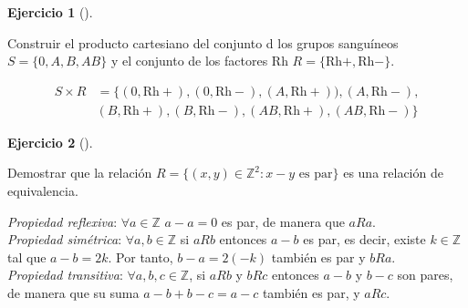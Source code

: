 \documentclass[
  spanish,
  a4paper,
]{scrreport}
\theoremstyle{definition}
\newtheorem{exercise}{Ejercicio}[chapter]
\theoremstyle{remark}
\begin{document}
\begin{exercise}[]\protect\hypertarget{exr-producto-cartesiano-grupos-sanguineos}{}\label{exr-producto-cartesiano-grupos-sanguineos}

Construir el producto cartesiano del conjunto d los grupos sanguíneos
\(S=\{0, A, B, AB\}\) y el conjunto de los factores Rh
\(R=\{\mbox{Rh}+, \mbox{Rh}-\}\).

\end{exercise}

\begin{tcolorbox}[enhanced jigsaw, arc=.35mm, bottomrule=.15mm, bottomtitle=1mm, breakable, colback=white, colbacktitle=quarto-callout-tip-color!10!white, colframe=quarto-callout-tip-color-frame, coltitle=black, left=2mm, leftrule=.75mm, opacityback=0, opacitybacktitle=0.6, rightrule=.15mm, title=\textcolor{quarto-callout-tip-color}{\faLightbulb}\hspace{0.5em}{Solución}, titlerule=0mm, toprule=.15mm, toptitle=1mm]

\begin{align*}
S \times R &=\{(0,\mbox{Rh}+), (0,\mbox{Rh}-), (A,\mbox{Rh}+)), (A,\mbox{Rh}-),\\
& (B,\mbox{Rh}+), (B,\mbox{Rh}-), (AB,\mbox{Rh}+), (AB,\mbox{Rh}-) \}
\end{align*}

\end{tcolorbox}

\begin{exercise}[]\protect\hypertarget{exr-relacion-equivalencia-1}{}\label{exr-relacion-equivalencia-1}

Demostrar que la relación
\(R=\{(x,y)\in \mathbb{Z}^2: x-y \mbox{ es par}\}\) es una relación de
equivalencia.

\end{exercise}

\begin{tcolorbox}[enhanced jigsaw, arc=.35mm, bottomrule=.15mm, bottomtitle=1mm, breakable, colback=white, colbacktitle=quarto-callout-tip-color!10!white, colframe=quarto-callout-tip-color-frame, coltitle=black, left=2mm, leftrule=.75mm, opacityback=0, opacitybacktitle=0.6, rightrule=.15mm, title=\textcolor{quarto-callout-tip-color}{\faLightbulb}\hspace{0.5em}{Solución}, titlerule=0mm, toprule=.15mm, toptitle=1mm]

\emph{Propiedad reflexiva}: \(\forall a\in\mathbb{Z}\) \(a-a=0\) es par,
de manera que \(aRa\).\\
\emph{Propiedad simétrica}: \(\forall a,b\in\mathbb{Z}\) si \(aRb\)
entonces \(a-b\) es par, es decir, existe \(k\in \mathbb{Z}\) tal que
\(a-b=2k\). Por tanto, \(b-a=2(-k)\) también es par y \(bRa\).\\
\emph{Propiedad transitiva}: \(\forall a,b,c\in\mathbb{Z}\), si \(aRb\)
y \(bRc\) entonces \(a-b\) y \(b-c\) son pares, de manera que su suma
\(a-b+b-c = a-c\) también es par, y \(aRc\).

\end{tcolorbox}
\end{document}
